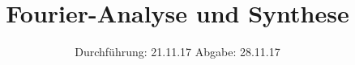 

\subject{V351}
\title{Fourier-Analyse und Synthese}
\date{%
  Durchführung: 21.11.17
  \hspace{3em}
  Abgabe: 28.11.17
}



\maketitle
\thispagestyle{empty}
\tableofcontents
\newpage






\printbibliography{}


